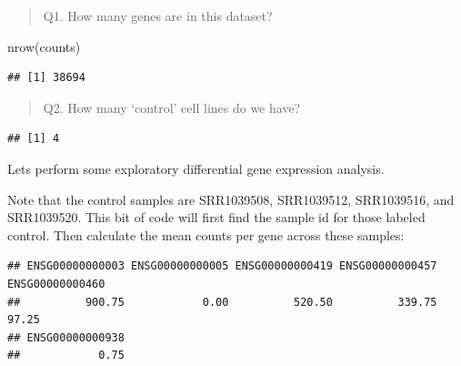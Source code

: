 \documentclass[
]{article}
\newenvironment{Shaded}{\begin{snugshade}}{\end{snugshade}}
\newcommand{\DecValTok}[1]{\textcolor[rgb]{0.00,0.00,0.81}{#1}}
\newcommand{\FunctionTok}[1]{\textcolor[rgb]{0.00,0.00,0.00}{#1}}
\newcommand{\NormalTok}[1]{#1}
\newcommand{\OtherTok}[1]{\textcolor[rgb]{0.56,0.35,0.01}{#1}}
\newcommand{\SpecialCharTok}[1]{\textcolor[rgb]{0.00,0.00,0.00}{#1}}
\newcommand{\StringTok}[1]{\textcolor[rgb]{0.31,0.60,0.02}{#1}}
\begin{document}
\begin{quote}
Q1. How many genes are in this dataset?
\end{quote}

\begin{Shaded}
\begin{Highlighting}[]
\FunctionTok{nrow}\NormalTok{(counts)}
\end{Highlighting}
\end{Shaded}

\begin{verbatim}
## [1] 38694
\end{verbatim}

\begin{quote}
Q2. How many `control' cell lines do we have?
\end{quote}

\begin{Shaded}
\end{Shaded}

\begin{verbatim}
## [1] 4
\end{verbatim}

Lets perform some exploratory differential gene expression analysis.

Note that the control samples are SRR1039508, SRR1039512, SRR1039516,
and SRR1039520. This bit of code will first find the sample id for those
labeled control. Then calculate the mean counts per gene across these
samples:

\begin{Shaded}
\end{Shaded}

\begin{verbatim}
## ENSG00000000003 ENSG00000000005 ENSG00000000419 ENSG00000000457 ENSG00000000460 
##          900.75            0.00          520.50          339.75           97.25 
## ENSG00000000938 
##            0.75
\end{verbatim}
\end{document}
